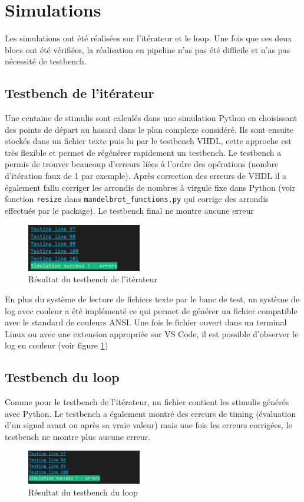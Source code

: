 \documentclass[LPSC_Labo03_SDeriaz]{subfiles}
\begin{document}
\section{Simulations}
Les simulations ont été réalisées sur l'itérateur et le loop. Une fois que ces deux blocs ont été vérifiées, la réalisation en pipeline n'as pas été difficile et n'as pas nécessité de testbench.
\subsection{Testbench de l'itérateur}
Une centaine de stimulis sont calculés dans une simulation Python en choisissant des points de départ au hasard dans le plan complexe considéré. Ils sont ensuite stockés dans un fichier texte puis lu par le testbench VHDL, cette approche est très flexible et permet de régénérer rapidement un testbench. Le testbench a permis de trouver beaucoup d'erreurs liées à l'ordre des opérations (nombre d'itération faux de 1 par exemple). Après correction des erreurs de VHDL il a également fallu corriger les arrondis de nombres à virgule fixe dans Python (voir fonction \verb!resize! dans \verb!mandelbrot_functions.py! qui corrige des arrondis effectués par le package). Le testbench final ne montre aucune erreur
\begin{figure}[H]
\centering
\includegraphics[width=5cm]{testbench_iteration.png}
\caption{Résultat du testbench de l'itérateur}
\label{fig_testbench_iteration}
\end{figure}
En plus du système de lecture de fichiers texte par le banc de test, un système de log avec couleur a été implémenté ce qui permet de générer un fichier compatible avec le standard de couleurs ANSI. Une fois le fichier ouvert dans un terminal Linux ou avec une extension appropriée sur VS Code, il est possible d'observer le log en couleur (voir figure \ref{fig_testbench_iteration})
\subsection{Testbench du loop}
Comme pour le testbench de l'itérateur, un fichier contient les stimulis générés avec Python. Le testbench a également montré des erreurs de timing (évaluation d'un signal avant ou après sa vraie valeur) mais une fois les erreurs corrigées, le testbench ne montre plus aucune erreur.
\begin{figure}[H]
\centering
\includegraphics[width=5cm]{testbench_loop.png}
\caption{Résultat du testbench du loop}
\end{figure}
\end{document}
